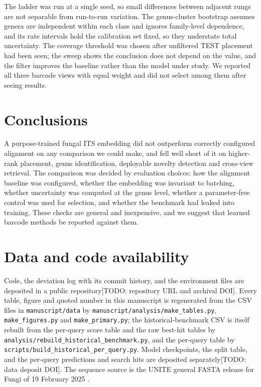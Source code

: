 \documentclass[11pt]{article}
\newcommand{\todo}[1]{\textcolor{todoblue}{[TODO: #1]}}
\newcommand{\todo}[1]{}
\begin{document}
The ladder was run at a single seed, so small differences between adjacent rungs
are not separable from run-to-run variation. The genus-cluster bootstrap assumes
genera are independent within each class and ignores family-level dependence,
and its rate intervals hold the calibration set fixed, so they understate total
uncertainty. The coverage threshold was chosen after unfiltered TEST placement
had been seen; the sweep shows the conclusion does not depend on the value, and
the filter improves the baseline rather than the model under study. We reported
all three barcode views with equal weight and did not select among them after
seeing results.

\section{Conclusions}
A purpose-trained fungal ITS embedding did not outperform correctly configured
alignment on any comparison we could make, and fell well short of it on
higher-rank placement, genus identification, deployable novelty detection and
cross-view retrieval. The comparison was decided by evaluation choices: how the
alignment baseline was configured, whether the embedding was invariant to
batching, whether uncertainty was computed at the genus level, whether a
parameter-free control was used for selection, and whether the benchmark had
leaked into training. These checks are general and inexpensive, and we suggest
that learned barcode methods be reported against them.

\section*{Data and code availability}
Code, the deviation log with its commit history, and the environment files are
deposited in a public repository\todo{repository URL and archival DOI}. Every table, figure and
quoted number in this manuscript is regenerated from the CSV files in
\texttt{manuscript/data} by \texttt{manuscript/analysis/make\_tables.py},
\texttt{make\_figures.py} and \texttt{make\_primary.py}; the historical-benchmark
CSV is itself rebuilt from the per-query score table and the raw best-hit
tables by \texttt{analysis/rebuild\_historical\_benchmark.py}, and the per-query
table by \texttt{scripts/build\_historical\_per\_query.py}. Model checkpoints,
the split table, and the per-query predictions and search hits are deposited
separately\todo{data deposit DOI}. The sequence source is the UNITE general
FASTA release for Fungi of 19 February 2025 \cite{unite2025release}.
\end{document}
